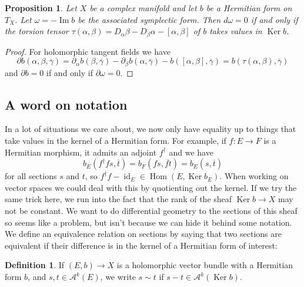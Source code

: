 \documentclass[10pt,a4paper]{amsart}
\newtheorem{prop}[theo]{Proposition}
\theoremstyle{definition}
\newtheorem{defi}[theo]{Definition}
\newcommand{\cc}[1]{\mathcal{#1}}
\def\ov#1{\overline{#1}}
\DeclareMathOperator{\Ker}{Ker}
\DeclareMathOperator{\Hom}{Hom}
\DeclareMathOperator{\id}{id}
\begin{document}
\begin{prop}
Let $X$ be a complex manifold and let $b$ be a Hermitian form on $T_X$.
Let $\omega = -\operatorname{Im} b$ be the associated symplectic form.
Then $d \omega = 0$ if and only if the torsion tensor $\tau(\alpha,\beta) = D_\alpha \beta - D_\beta \alpha - [\alpha, \beta]$ of $b$ takes values in $\Ker b$.
\end{prop}

\begin{proof}
For holomorphic tangent fields we have
\[
\partial b (\alpha, \beta, \ov \gamma)
= \partial_\alpha b(\beta, \ov\gamma)
- \partial_\beta b(\alpha, \ov\gamma)
- b([\alpha,\beta], \ov\gamma)
= b(\tau(\alpha,\beta), \ov\gamma)
\]
and $\partial b = 0$ if and only if $\partial \omega = 0$.
\end{proof}



\subsection*{A word on notation}


In a lot of situations we care about, we now only have equality up to things that take values in the kernel of a Hermitian form. For example, if $f : E \to F$ is a Hermitian morphism, it admits an adjoint $f^\dagger$ and we have
\[
b_E(f^\dagger f s, \ov t)
= b_F(f s, \ov{f t})
= b_E(s, \ov t)
\]
for all sections $s$ and $t$, so $f^\dagger f - \id_E \in \Hom(E, \Ker b_E)$.
When working on vector spaces we could deal with this by quotienting out the
kernel. If we try the same trick here, we run into the fact that the rank of
the sheaf $\Ker b \to X$ may not be constant. We want to do differential
geometry to the sections of this sheaf so seems like a problem, but isn't
because we can hide it behind some notation.
We define an equivalence relation on sections by saying that two sections are
equivalent if their difference is in the kernel of a Hermitian form of
interest:


\begin{defi}
If $(E, b) \to X$ is a holomorphic vector bundle with a Hermitian form $b$, and $s, t \in \cc A^k(E)$, we write
\(
s \sim t
\)
if $s - t \in \cc A^k(\Ker b)$.
\end{defi}
\end{document}
